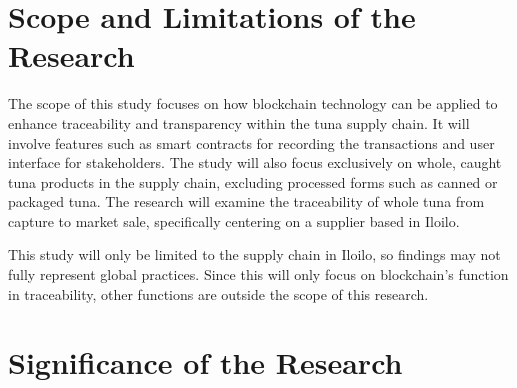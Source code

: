\section{Scope and Limitations of the Research}
\label{sec:scopelimitations}

The scope of this study focuses on how blockchain technology can be applied to enhance traceability and transparency within the tuna supply chain. It will involve features such as smart contracts for recording the transactions and user interface for stakeholders. The study will also focus exclusively on whole, caught tuna products in the supply chain, excluding processed forms such as canned or packaged tuna. The research will examine the traceability of whole tuna from capture to market sale, specifically centering on a supplier based in Iloilo. 

\noindent This study will only be limited to the supply chain in Iloilo, so findings may not fully represent global practices. Since this will only focus on blockchain’s function in traceability, other functions are outside the scope of this research. 


\begin{comment}

%
%
Generally, one paragraph should be allotted for each of your research objectives.

Each paragraph contains a brief overview of the concept/theory and the purpose of doing the associated objective.

Each paragraph also includes a description of the scope/limitation of your study.

* Please refer to the slides for examples.

\end{comment}


\section{Significance of the Research}
\label{sec:significance}

